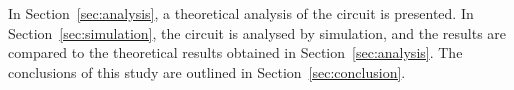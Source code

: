 In Section~\ref{sec:analysis}, a theoretical analysis of the circuit is
presented. In Section~\ref{sec:simulation}, the circuit is analysed by
simulation, and the results are compared to the theoretical results obtained in
Section~\ref{sec:analysis}. The conclusions of this study are outlined in
Section~\ref{sec:conclusion}. \\


